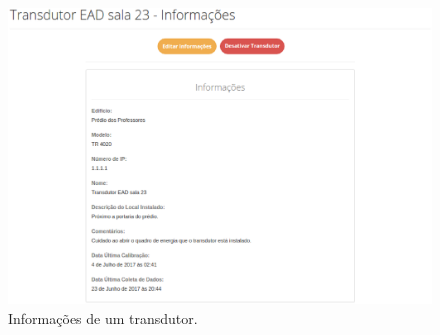 \begin{apendicesenv}
\begin{figure}[!htpb]
    \centering
    \includegraphics[keepaspectratio=true,scale=0.6]{figuras/img13.eps}
    \caption{Informações de um transdutor.}
    \label{img13}
\end{figure}


\end{apendicesenv}
